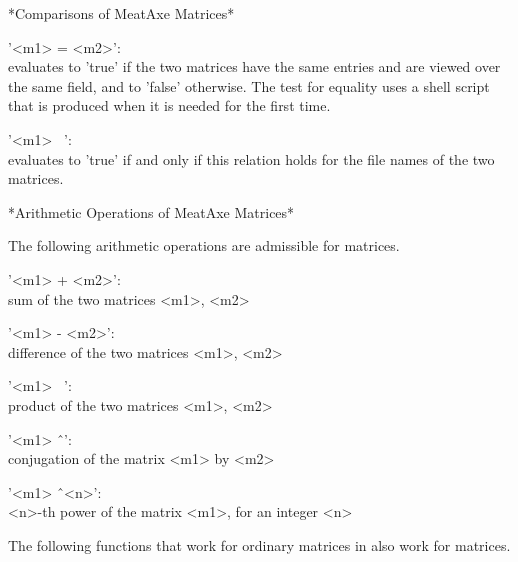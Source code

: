 
*Comparisons of MeatAxe Matrices*

'<m1> = <m2>':\\ evaluates to 'true' if the two {\MeatAxe} matrices have the
                 same entries and are viewed over the same field, and to
                 'false' otherwise.
                 The test for equality uses a shell script that is produced
                 when it is needed for the first time.

'<m1> \<\ <m2>': \\ evaluates to 'true' if and only if this relation holds
                    for the file names of the two {\MeatAxe} matrices.

\vspace{5mm}

*Arithmetic Operations of MeatAxe Matrices*

The following arithmetic operations are admissible for {\MeatAxe} matrices.

'<m1> + <m2>':\\   sum of the two {\MeatAxe} matrices <m1>, <m2>

'<m1> - <m2>':\\   difference of the two {\MeatAxe} matrices <m1>, <m2>

'<m1> \*\ <m2>':\\ product of the two {\MeatAxe} matrices <m1>, <m2>

'<m1> \^\ <m2>':\\ conjugation of the {\MeatAxe} matrix <m1> by <m2>

'<m1> \^\ <n>':\\  <n>-th power of the {\MeatAxe} matrix <m1>,
                   for an integer <n>


The following functions that work for ordinary matrices in {\GAP} also
work for {\MeatAxe} matrices.

